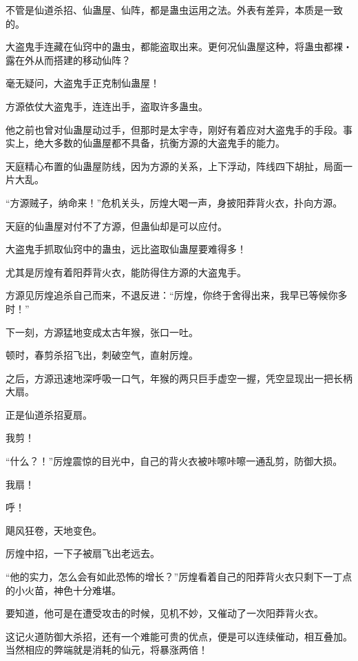 \begin{this_body}
不管是仙道杀招、仙蛊屋、仙阵，都是蛊虫运用之法。外表有差异，本质是一致的。

大盗鬼手连藏在仙窍中的蛊虫，都能盗取出来。更何况仙蛊屋这种，将蛊虫都裸・露在外从而搭建的移动仙阵？

毫无疑问，大盗鬼手正克制仙蛊屋！

方源依仗大盗鬼手，连连出手，盗取许多蛊虫。

他之前也曾对仙蛊屋动过手，但那时是太宇寺，刚好有着应对大盗鬼手的手段。事实上，绝大多数的仙蛊屋都不具备，抗衡方源的大盗鬼手的能力。

天庭精心布置的仙蛊屋防线，因为方源的关系，上下浮动，阵线四下胡扯，局面一片大乱。

“方源贼子，纳命来！”危机关头，厉煌大喝一声，身披阳莽背火衣，扑向方源。

天庭的仙蛊屋对付不了方源，但蛊仙却是可以应付。

大盗鬼手抓取仙窍中的蛊虫，远比盗取仙蛊屋要难得多！

尤其是厉煌有着阳莽背火衣，能防得住方源的大盗鬼手。

方源见厉煌追杀自己而来，不退反进：“厉煌，你终于舍得出来，我早已等候你多时！”

下一刻，方源猛地变成太古年猴，张口一吐。

顿时，春剪杀招飞出，刺破空气，直射厉煌。

之后，方源迅速地深呼吸一口气，年猴的两只巨手虚空一握，凭空显现出一把长柄大扇。

正是仙道杀招夏扇。

我剪！

“什么？！”厉煌震惊的目光中，自己的背火衣被咔嚓咔嚓一通乱剪，防御大损。

我扇！

呼！

飓风狂卷，天地变色。

厉煌中招，一下子被扇飞出老远去。

“他的实力，怎么会有如此恐怖的增长？”厉煌看着自己的阳莽背火衣只剩下一丁点的小火苗，神色十分难堪。

要知道，他可是在遭受攻击的时候，见机不妙，又催动了一次阳莽背火衣。

这记火道防御大杀招，还有一个难能可贵的优点，便是可以连续催动，相互叠加。当然相应的弊端就是消耗的仙元，将暴涨两倍！

\end{this_body}

